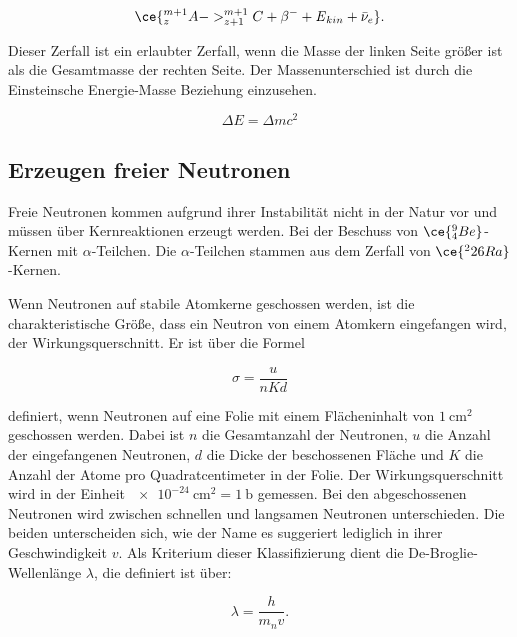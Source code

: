 \begin{equation*}
  \ce{^{m+1}_{z}A -> ^{m+1}_{z+1}C + \beta^{-} + \text{\emph{E}}_{kin} + \bar{\nu}_{e}}.
\end{equation*}

Dieser Zerfall ist ein erlaubter Zerfall, wenn die Masse der linken Seite
größer ist als die Gesamtmasse der rechten Seite. Der Massenunterschied
ist durch die Einsteinsche Energie-Masse Beziehung einzusehen.

\begin{equation}
  \label{eqn:Einstein}
  \Delta E = \Delta mc^2
\end{equation}

\subsection{Erzeugen freier Neutronen}

Freie Neutronen kommen aufgrund ihrer Instabilität nicht in der Natur vor und
müssen über Kernreaktionen erzeugt werden. Bei der Beschuss von $\ce{^9_4Be}$-Kernen
mit $\alpha$-Teilchen. Die $\alpha$-Teilchen stammen aus dem Zerfall von
$\ce{^226Ra}$-Kernen.

Wenn Neutronen auf stabile Atomkerne geschossen werden, ist die
charakteristische Größe, dass ein Neutron von einem Atomkern eingefangen wird,
der Wirkungsquerschnitt. Er ist über die Formel

\begin{equation}
  \label{eqn:Wirkungsquerschnitt}
  \sigma = \frac{u}{nKd}
\end{equation}

definiert, wenn Neutronen auf eine Folie mit einem Flächeninhalt von
$\SI{1}{\centi\meter^2}$ geschossen werden.
Dabei ist $n$ die Gesamtanzahl der Neutronen, $u$ die
Anzahl der eingefangenen Neutronen, $d$ die Dicke der beschossenen Fläche und
$K$ die Anzahl der Atome pro Quadratcentimeter in der Folie.
Der Wirkungsquerschnitt wird in der Einheit $\SI{e-24}{\centi\meter^2} = \SI{1}{\barn}$
gemessen.
Bei den abgeschossenen Neutronen wird zwischen schnellen und langsamen Neutronen
unterschieden. Die beiden unterscheiden sich, wie der Name es suggeriert
lediglich in ihrer Geschwindigkeit $v$. Als Kriterium dieser Klassifizierung
dient die De-Broglie-Wellenlänge $\lambda$, die definiert ist über:

\begin{equation}
  \label{eqn:debroglie}
  \lambda = \frac{h}{m_n v}.
\end{equation}

